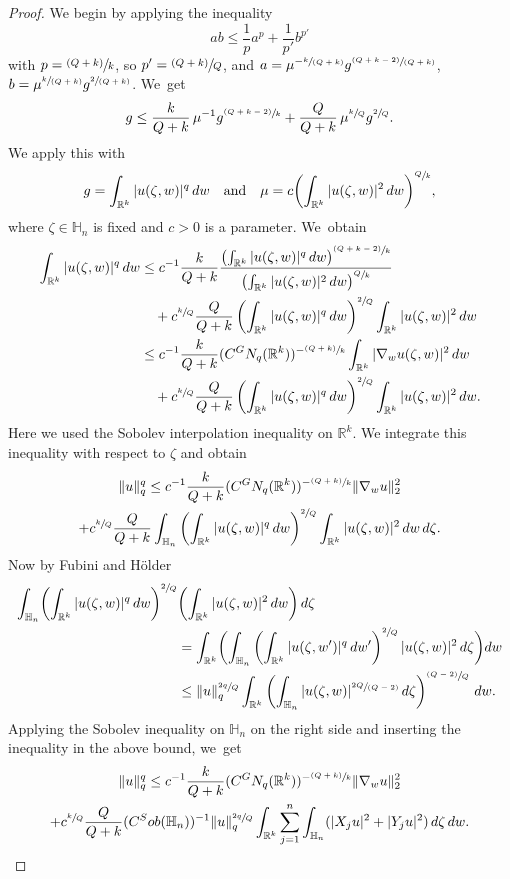 \documentclass[11pt]{article}
\let\oldsfrac\sfrac
\renewcommand{\sfrac}[2]{{\oldsfrac{#1}{#2}}}
\newcommand{\psfrac}[2]{{\sfrac{(#1)}{#2}}}
\newcommand{\spfrac}[2]{{\sfrac{#1}{(#2)}}}
\newcommand{\pspfrac}[2]{{\sfrac{(#1)}{(#2)}}}
\newcommand{\GN}{\textup{GN}}
\newcommand{\Sob}{\textup{Sob}}
\theoremstyle{definition}
\newcommand{\1}{\mathbbm{1}}
\newcommand{\R}{\mathbb{R}}
\numberwithin{equation}{section}
\begin{document}
\begin{proof}
We begin by applying the inequality
\[
ab \leq \frac1p a^p + \frac1{p'} b^{p'}
\]
with $p=\psfrac{Q+k}{k}$, so $p'=\psfrac{Q+k}{Q}$, and $a=\mu^{-\spfrac{k}{Q+k}} g^{\pspfrac{Q+k-2}{Q+k}}$, $b= \mu^{\spfrac{k}{Q+k}} g^{\spfrac{2}{Q+k}}$. We~get
\[
g \leq \frac{k}{Q+k}\,\mu^{-1} g^{\psfrac{Q+k-2}{k}} + \frac{Q}{Q+k}\,\mu^{\sfrac kQ} g^{\sfrac{2}{Q}}.
\]
We apply this with
\[
g = \int_{\R^k} |u(\zeta,w)|^q\,dw
\quad\text{and}\quad
\mu = c\biggl(\int_{\R^k} |u(\zeta,w)|^2\,dw\biggr)^{\sfrac{Q}{k}},
\]
where $\zeta\in\mathbb H_n$ is fixed and $c>0$ is a parameter. We~obtain
\begin{align*}
\int_{\R^k} |u(\zeta,w)|^q\,dw & \leq c^{-1} \frac{k}{Q+k} \frac{\left(\int_{\R^k} |u(\zeta,w)|^q\,dw\right)^{\psfrac{Q+k-2}{k}}}{\left(\int_{\R^k} |u(\zeta,w)|^2\,dw\right)^{\sfrac{Q}{k}}} \\
& \quad + c^{\sfrac{k}{Q}} \frac{Q}{Q+k} \left(\int_{\R^k} |u(\zeta,w)|^q\,dw\right)^{\sfrac2Q} \int_{\R^k} |u(\zeta,w)|^2\,dw \\
& \leq c^{-1} \frac{k}{Q+k} (C^\GN_{q}(\R^k))^{-\psfrac{Q+k}{k}} \int_{\R^k} |\nabla_w u(\zeta,w)|^2\,dw \\
& \quad
+ c^{\sfrac{k}{Q}} \frac{Q}{Q+k} \left(\int_{\R^k} |u(\zeta,w)|^q\,dw\right)^{\sfrac2Q} \int_{\R^k} |u(\zeta,w)|^2\,dw.
\end{align*}
Here we used the Sobolev interpolation inequality on $\R^k$.
We integrate this inequality with respect to $\zeta$ and obtain
\begin{multline*}
\|u\|_q^q \leq c^{-1} \frac{k}{Q+k} (C^\GN_{q}(\R^k))^{-\psfrac{Q+k}{k}} \| \nabla_w u\|_2^2 \\
+ c^{\sfrac{k}{Q}} \frac{Q}{Q+k} \int_{\mathbb H_n} \left(\int_{\R^k} |u(\zeta,w)|^q\,dw\right)^{\sfrac2Q} \int_{\R^k} |u(\zeta,w)|^2\,dw\,d\zeta.
\end{multline*}
Now by Fubini and Hölder
\begin{align*}
\int_{\mathbb H_n} \biggl(\int_{\R^k} |u(\zeta,w)|^q\,dw \biggr)^{\sfrac2Q}& \biggl(\int_{\R^k} |u(\zeta,w)|^2\,dw \biggr) \,d\zeta \\
& = \int_{\R^k} \biggl(\int_{\mathbb H_n} \left(\int_{\R^k} |u(\zeta,w')|^q\,dw'\right)^{\sfrac2Q} |u(\zeta,w)|^2\,d\zeta\biggr) dw \\
& \leq \| u \|_q^{\sfrac{2q}{Q}} \int_{\R^k} \left(\int_{\mathbb H_n} |u(\zeta,w)|^{\spfrac{2Q}{Q-2}} \,d\zeta\right)^{\psfrac{Q-2}{Q}}\,dw.
\end{align*}
Applying the Sobolev inequality on $\mathbb H_n$ on the right side and inserting the inequality in the above bound, we~get
\begin{multline*}
\|u\|_q^q \leq c^{-1} \frac{k}{Q+k} (C^\GN_{q}(\R^k))^{-\psfrac{Q+k}{k}} \| \nabla_w u\|_2^2 \\
+ c^{\sfrac{k}{Q}} \frac{Q}{Q+k} (C^\Sob(\mathbb H_n))^{-1} \| u \|_q^{\sfrac{2q}{Q}} \int_{\R^k} \sum_{j=1}^n \int_{\mathbb H_n} (|X_ju|^2 + |Y_ju|^2)\,d\zeta \,dw.
\end{multline*}


\end{proof}
\end{document}
